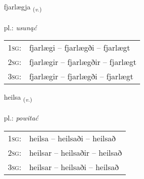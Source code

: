 \documentclass[frontgrid, backgrid]{flacards}\usepackage[]{graphicx}\usepackage[]{xcolor}
\begin{document}
\renewcommand{\flhead}{\vskip5pt \fboxsep=0pt {\small\bfseries\footnotesize Sagnorð | czasownik}}
\renewcommand{\fcfoot}{\vskip5pt \fboxsep=0pt \hspace{2pt}{\small\bfseries\footnotesize 3K}}

\renewcommand{\blhead}{\vskip5pt {\small\bfseries\footnotesize Sagnorð | czasownik }}
\renewcommand{\bcfoot}{\vskip5pt \hspace{2pt}{\small\bfseries\footnotesize 3K}}


{fjarlægja \small{\textsubscript{(\textit{v.})}} \\[1ex] %
\textphonetic{[fjarlaija]} \\
pl.: \emph{usunąć} \\  [2ex]
\renewcommand*{\arraystretch}{0.8}
\begin{tabular}{p{1cm}l}
\textsc{1sg}: & fjarlægi -- fjarlægði -- fjarlægt \\ 
\textsc{2sg}: & fjarlægir -- fjarlægðir -- fjarlægt \\ 
\textsc{3sg}: & fjarlægir -- fjarlægði -- fjarlægt \\ 
\end{tabular}
}

\renewcommand{\flhead}{\vskip5pt \fboxsep=0pt {\small\bfseries\footnotesize Sagnorð | czasownik}}
\renewcommand{\fcfoot}{\vskip5pt \fboxsep=0pt \hspace{2pt}{\small\bfseries\footnotesize 3K}}

\renewcommand{\blhead}{\vskip5pt {\small\bfseries\footnotesize Sagnorð | czasownik }}
\renewcommand{\bcfoot}{\vskip5pt \hspace{2pt}{\small\bfseries\footnotesize 3K}}


{heilsa \small{\textsubscript{(\textit{v.})}} \\[1ex] %
\textphonetic{[heilsa]} \\
pl.: \emph{powitać} \\  [2ex]
\renewcommand*{\arraystretch}{0.8}
\begin{tabular}{p{1cm}l}
\textsc{1sg}: & heilsa -- heilsaði -- heilsað \\ 
\textsc{2sg}: & heilsar -- heilsaðir -- heilsað \\ 
\textsc{3sg}: & heilsar -- heilsaði -- heilsað \\ 
\end{tabular}
}
\end{document}
